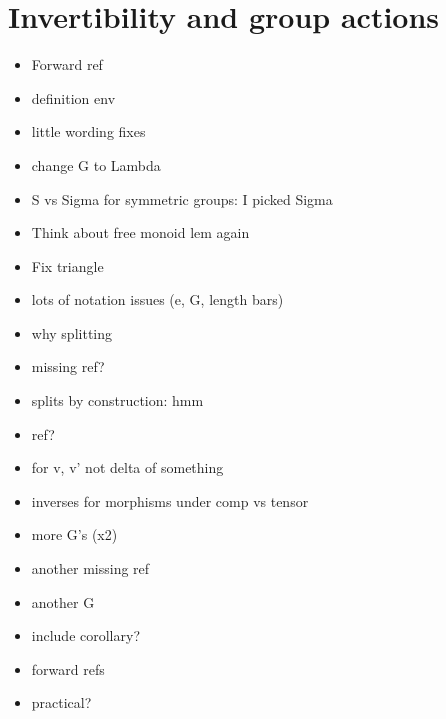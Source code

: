 \documentclass{amsart}
\begin{document}
\section{ Invertibility and group actions}
\begin{itemize}
\item Forward ref
\item definition env
\item little wording fixes
\item change G to Lambda
\item S vs Sigma for symmetric groups: I picked Sigma
\item Think about free monoid lem again
\item Fix triangle
\item lots of notation issues (e, G, length bars)
\item why splitting
\item missing ref?
\item splits by construction: hmm
\item ref?
\item for v, v' not delta of something
\item inverses for morphisms under comp vs tensor
\item more G's (x2)
\item another missing ref
\item another G
\item include corollary? 
\item forward refs
\item practical?
\end{itemize}
\end{document}
